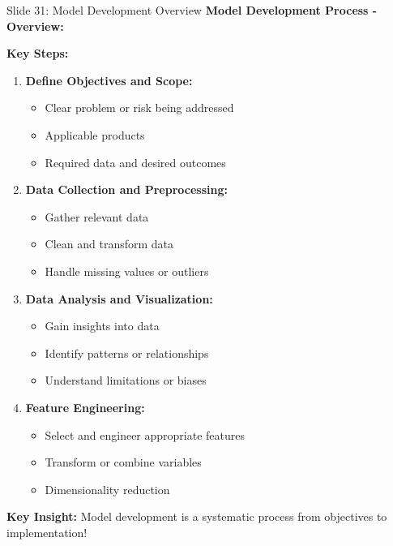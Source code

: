 \documentclass[8pt]{beamer}
\begin{document}
	
	\begin{frame}{Slide 31: Model Development Overview}
		\fontsize{6.5}{7.5}\selectfont
		\textbf{Model Development Process - Overview:}
		
		\vspace{0.1cm}
		\textbf{Key Steps:}
		\begin{enumerate}
			\item \textbf{Define Objectives and Scope:}
			\begin{itemize}
				\item Clear problem or risk being addressed
				\item Applicable products
				\item Required data and desired outcomes
			\end{itemize}
			\item \textbf{Data Collection and Preprocessing:}
			\begin{itemize}
				\item Gather relevant data
				\item Clean and transform data
				\item Handle missing values or outliers
			\end{itemize}
			\item \textbf{Data Analysis and Visualization:}
			\begin{itemize}
				\item Gain insights into data
				\item Identify patterns or relationships
				\item Understand limitations or biases
			\end{itemize}
			\item \textbf{Feature Engineering:}
			\begin{itemize}
				\item Select and engineer appropriate features
				\item Transform or combine variables
				\item Dimensionality reduction
			\end{itemize}
		\end{enumerate}
		
		\textcolor{myblue}{\textbf{Key Insight:}} Model development is a \textcolor{myblue}{systematic process from objectives to implementation}!
	\end{frame}
	
\end{document}
